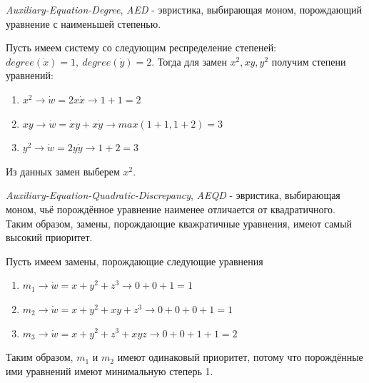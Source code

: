 \begin{heuristics} \label{AED}
    \textit{Auxiliary-Equation-Degree}, \textit{AED} - эвристика, выбирающая моном, порождающий уравнение с наименьшей степенью. 
    
    \begin{example}
        Пусть имеем систему со следующим респределение степеней: $degree(\dot x) = 1,\ degree(\dot y) = 2$. Тогда для замен $x^2, xy, y^2$ получим степени уравнений:
        \begin{enumerate}
            \item $x^2 \longrightarrow \dot w = 2x \dot x \longrightarrow 1 + 1 = 2$
            \item $xy \longrightarrow \dot w = \dot x y + x \dot y \longrightarrow max(1 + 1, 1 + 2) = 3$
            \item $y^2 \longrightarrow \dot w = 2y \dot y \longrightarrow 1 + 2 = 3$
        \end{enumerate}
        Из данных замен выберем $x^2$.
    \end{example}
\end{heuristics}

\begin{heuristics} \label{AEQD}
    \textit{Auxiliary-Equation-Quadratic-Discrepancy}, \textit{AEQD} - эвристика, выбирающая моном, чьё порождённое уравнение наименее отличается от квадратичного. Таким образом, замены, порождающие кважратичные уравнения, имеют самый высокий приоритет. 
    
    \begin{example}
        Пусть имеем замены, порождающие следующие уравнения
        \begin{enumerate}
            \item $m_1 \longrightarrow \dot w = x + y^2 + z^3 \longrightarrow 0 + 0 + 1 = 1$
            \item $m_2 \longrightarrow \dot w = x + y^2 + xy + z^3 \longrightarrow 0 + 0 + 0 + 1 = 1$
            \item $m_3 \longrightarrow \dot w = x + y^2 + z^3 + xyz \longrightarrow 0 + 0 +1 + 1 = 2$
        \end{enumerate}
        Таким образом, $m_1$ и $m_2$ имеют одинаковый приоритет, потому что порождённые ими уравнений имеют минимальную степерь 1.
    \end{example}
\end{heuristics}

